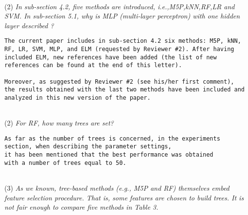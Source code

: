 \documentclass[preprint]{elsarticle}
\begin{document}
~\\
\noindent (2) \emph{In sub-section 4.2, five methods are introduced, i.e.,M5P,kNN,RF,LR and SVM. In sub-section 5.1, why is MLP (multi-layer perceptron) with one hidden layer described ?} 

\begin{verbatim}
The current paper includes in sub-section 4.2 six methods: M5P, kNN, 
RF, LR, SVM, MLP, and ELM (requested by Reviewer #2). After having 
included ELM, new references have been added (the list of new 
references can be found at the end of this letter).

Moreover, as suggested by Reviewer #2 (see his/her first comment), 
the results obtained with the last two methods have been included and 
analyzed in this new version of the paper.
\end{verbatim}

~\\
\noindent (2) \emph{For RF, how many trees are set? }

\begin{verbatim}
As far as the number of trees is concerned, in the experiments 
section, when describing the parameter settings, 
it has been mentioned that the best performance was obtained 
with a number of trees equal to 50.
\end{verbatim}


~\\
\noindent (3) \emph{As we known, tree-based methods (e.g., M5P and RF) themselves embed feature selection procedure. That is, some features are chosen to build trees. It is not fair enough to compare five methods in Table 3. } 
\end{document}

